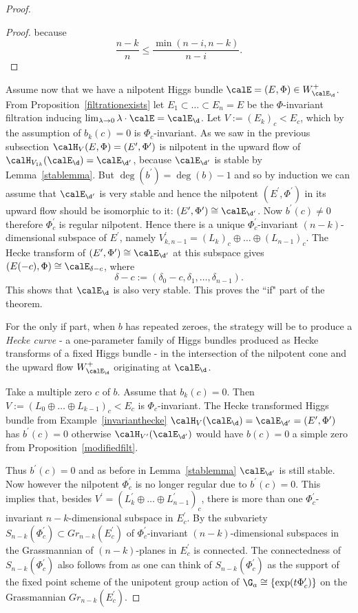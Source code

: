 \begin{proof}
\begin{proof}
		because $$\frac{n-k}{n}\leq \frac{\min(n-i,n-k)}{n-i}.$$
	\end{proof}

	Assume now that we have a nilpotent Higgs bundle $\calE=(E,\Phi)\in W^+_{\calE_{\d}}$. From Proposition~\ref{filtrationexists} let $E_1\subset\dots\subset E_n=E$ be the $\Phi$-invariant filtration  inducing $\lim_{\lambda\to 0}\lambda\cdot \calE=\calE_{\d}$. Let $V:=(E_{k})_c<E_c$, which by the assumption of $b_k(c)=0$ is $\Phi_c$-invariant. As we saw in the previous subsection $\calH_V(E,\Phi)=(E^\prime,\Phi^\prime)$ is nilpotent in the upward flow of $\calH_{V_{1k}}(\calE_{\d})=\calE_{\d^\prime}$, because $\calE_{\d^\prime}$ is stable by Lemma~\ref{stablemma}. But $\deg(b^\prime)=\deg(b)-1$ and so by induction we can assume that $\calE_{\d^\prime}$ is very stable and hence the nilpotent $(E^\prime,\Phi^\prime)$ in its upward flow should be isomorphic to it: $(E^\prime,\Phi^\prime)\cong \calE_{\d^\prime}$. Now $b^\prime(c)\neq 0$ therefore $\Phi^\prime_c$ is regular nilpotent. Hence there is a unique $\Phi^\prime_c$-invariant $(n-k)$-dimensional subspace of $E^\prime$, namely $V^\prime_{k,n-1}=(L_{k})_c\oplus \dots\oplus (L_{n-1})_c$. The Hecke transform of $(E^\prime,\Phi^\prime)\cong \calE_{\d^\prime}$ at this subspace gives $(E(-c),\Phi)\cong\calE_{\delta-c}$, where $$\delta-c:=(\delta_0-c,\delta_1,\dots,\delta_{n-1}).$$ This shows that $\calE_{\d}$ is also very stable. This proves the ``if" part of the theorem.

	For the only if part, when $b$ has repeated zeroes, the strategy will be to produce a {\em Hecke curve} \cite{NR} - a one-parameter family of Higgs bundles produced as Hecke transforms of a fixed Higgs bundle -   in the intersection of the nilpotent cone and the upward flow $W^+_{\calE_{\d}}$ originating at $\calE_{\d}$.

	Take a multiple zero $c$ of $b$. Assume that $b_k(c)=0$. Then $V:=(L_0\oplus \dots \oplus L_{k-1})_c<E_c$ is $\Phi_c$-invariant. The Hecke transformed Higgs bundle from Example~\ref{invarianthecke} $\calH_{V}(\calE_{\d})=\calE_{\d^\prime}=(E^\prime,\Phi^\prime)$ has  $b^\prime(c)=0$ otherwise $\calH_{V^\prime}(\calE_{\d^\prime})$ would have $b(c)=0$ a simple zero from Proposition~\ref{modifiedfilt}.

	Thus $b^\prime(c)=0$ and as before in Lemma~\ref{stablemma} $\calE_{\d^\prime}$ is still stable. Now however the nilpotent $\Phi^\prime_c$ is no longer regular due to $b^\prime(c)=0$. This implies that, besides $V^\prime=(L^\prime_{k}\oplus \dots \oplus L^\prime_{n-1})_c$,
	there is more than one $\Phi^\prime_c$-invariant $n-k$-dimensional subspace in $E^\prime_c$.  By \cite[Theorem 6]{shayman} the subvariety $S_{n-k}(\Phi^\prime_c)\subset Gr_{n-k}(E^\prime_c)$  of $\Phi^\prime_c$-invariant $(n-k)$-dimensional subspaces in the Grassmannian  of $(n-k)$-planes in $E^\prime_c$ is connected. The connectedness of $S_{n-k}(\Phi^\prime_c)$ also follows from \cite[Theorem 6.2]{horrocks} as one can think of $S_{n-k}(\Phi^\prime_c)$ as the support of the fixed point scheme of the unipotent group action of $\G_a\cong \{\exp(t \Phi^\prime_c)\}$ on the Grassmannian $Gr_{n-k}(E^\prime_c)$.


\end{proof}
